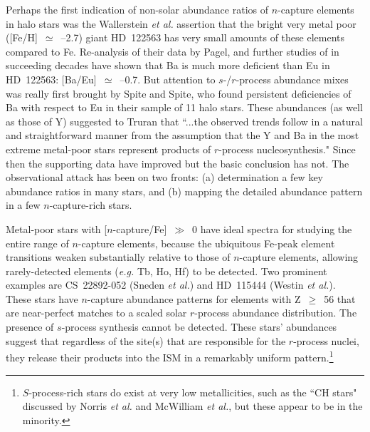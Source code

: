 \documentclass{ws-p8-50x6-00}
\begin{document}
Perhaps the first indication of non-solar abundance ratios of $n$-capture
elements in halo stars was the Wallerstein {\it et al.}\cite{Wa63} assertion
that the bright very metal poor ([Fe/H]~$\simeq$~--2.7) giant HD~122563 
has very small amounts of these elements compared to Fe.
Re-analysis of their data by Pagel\cite{Pa65}, and further studies of
in succeeding decades have shown that Ba is much more deficient than Eu 
in HD~122563: [Ba/Eu]~$\simeq$~--0.7.  
But attention to $s$-/$r$-process abundance mixes was really first 
brought by Spite and Spite\cite{SS78}, who found persistent deficiencies of 
Ba with respect to Eu in their sample of 11 halo stars.  
These abundances (as well as those of Y) suggested to Truran\cite{Tr81}
that ``...the observed trends follow in a natural and straightforward 
manner from the assumption that the Y and Ba in the most extreme metal-poor 
stars represent products of $r$-process nucleosynthesis."  
Since then the supporting data have improved but the basic conclusion has not.  
The observational attack has been on two fronts: (a) determination a few 
key abundance ratios in many stars, and (b) mapping the detailed 
abundance pattern in a few $n$-capture-rich stars.
 
Metal-poor stars with [$n$-capture/Fe]~$\gg$~0 have ideal spectra for
studying the entire range of $n$-capture elements, because the ubiquitous 
Fe-peak element transitions weaken substantially relative to those of
$n$-capture elements, allowing rarely-detected elements ({\it e.g.} Tb, Ho,
Hf) to be detected.  
Two prominent examples are CS~22892-052 (Sneden {\it et al.}\cite{Sn00}) and 
HD~115444 (Westin {\it et al.}\cite{We00}).  
These stars have $n$-capture abundance patterns for elements with 
Z~$\geq$~56 that are near-perfect matches to a scaled solar $r$-process 
abundance distribution.  
The presence of $s$-process synthesis cannot be detected.  
These stars' abundances suggest that regardless of the site(s) 
that are responsible for the $r$-process nuclei, they release their 
products into the ISM in a remarkably uniform pattern.\footnote{
$S$-process-rich stars do exist at very low metallicities, such as the 
``CH stars" discussed by Norris {\it et al.}\cite{No97} and McWilliam 
{\it et al.}\cite{Mc95}, but these appear to be in the minority.}
 
\end{document}
